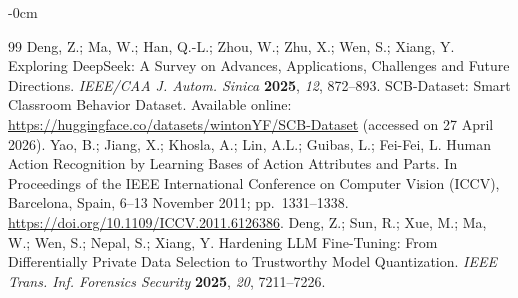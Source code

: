 \documentclass[symmetry,article,submit,pdftex,moreauthors]{Definitions/mdpi}
\begin{document}
\begin{adjustwidth}{-\extralength}{0cm}
\begin{thebibliography}{99}
 Deng, Z.; Ma, W.; Han, Q.-L.; Zhou, W.; Zhu, X.; Wen, S.; Xiang, Y.
Exploring DeepSeek: A Survey on Advances, Applications, Challenges and Future Directions.
\textit{IEEE/CAA J. Autom. Sinica} \textbf{2025}, \textit{12}, 872--893.
 SCB-Dataset: Smart Classroom Behavior Dataset.
Available online: \url{https://huggingface.co/datasets/wintonYF/SCB-Dataset} (accessed on 27 April 2026).
 Yao, B.; Jiang, X.; Khosla, A.; Lin, A.L.; Guibas, L.; Fei-Fei, L.
Human Action Recognition by Learning Bases of Action Attributes and Parts.
In Proceedings of the IEEE International Conference on Computer Vision (ICCV), Barcelona, Spain, 6--13 November 2011; pp.~1331--1338. \url{https://doi.org/10.1109/ICCV.2011.6126386}.
 Deng, Z.; Sun, R.; Xue, M.; Ma, W.; Wen, S.; Nepal, S.; Xiang, Y.
Hardening LLM Fine-Tuning: From Differentially Private Data Selection to Trustworthy Model Quantization.
\textit{IEEE Trans. Inf. Forensics Security} \textbf{2025}, \textit{20}, 7211--7226.
\end{thebibliography}

\end{adjustwidth}
\end{document}
